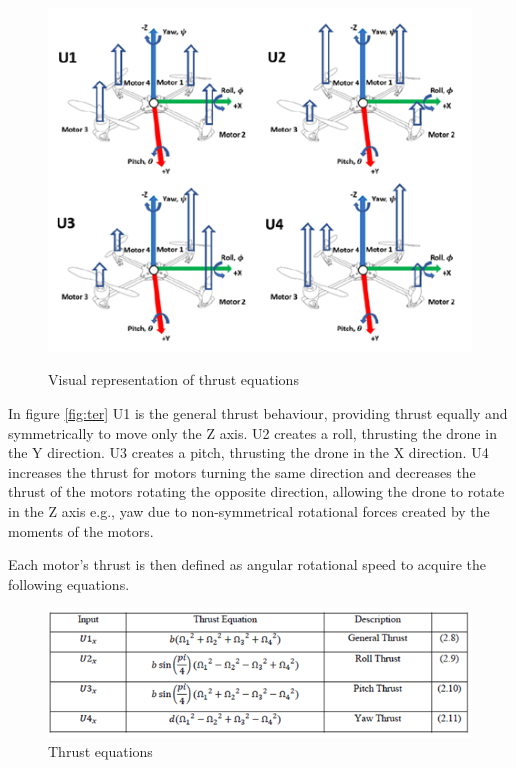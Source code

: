 \begin{figure}[H]
\begin{center}
   \includegraphics[scale =1]{pictures/control/thrust equations results.png}
   \label{ter}
\end{center}
\caption{Visual representation of thrust equations \cite{Ferry}}
\end{figure}

In figure \ref{fig:ter} U1 is the general thrust behaviour, providing thrust equally and symmetrically to move only the Z axis. U2 creates a roll, thrusting the drone in the Y direction. U3 creates a pitch, thrusting the drone in the X direction. U4 increases the thrust for motors turning the same direction and decreases the thrust of the motors rotating the opposite direction, allowing the drone to rotate in the Z axis e.g., yaw due to non-symmetrical rotational forces created by the moments of the motors.  \cite{Ferry}

Each motor's thrust is then defined as angular rotational speed to acquire the following equations.

\begin{figure}[H]
\begin{center}
   \includegraphics[scale =1]{pictures/control/thrust equations.png}
   
\end{center}
\caption{Thrust equations \cite{Ferry}}
\end{figure}

